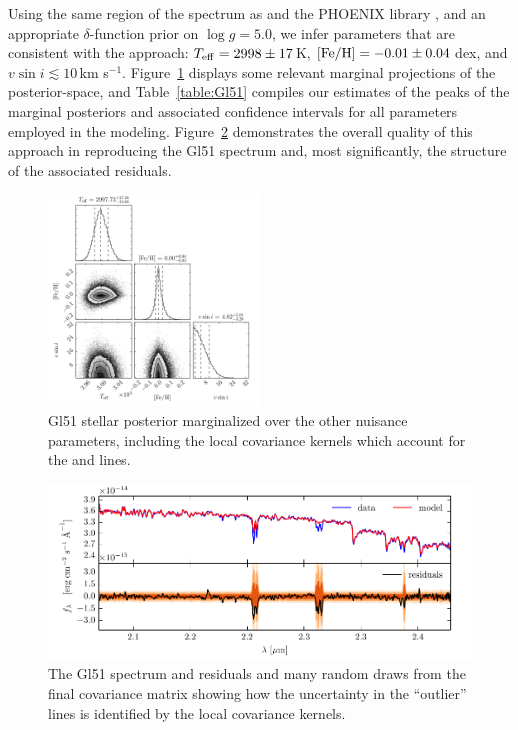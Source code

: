 \documentclass[iop,floatfix]{emulateapj}
\begin{document}
Using the same region of the spectrum as \citet{rojas-ayala12} and the {\sc PHOENIX} library \citep{husser13}, and an appropriate $\delta$-function prior on $\log
g = 5.0$, we infer parameters that are consistent with the \citet{rojas-ayala}
approach: $T_{\rm eff} = 2998 \pm17$\,K, $[{\rm Fe/H}] = -0.01\pm0.04$\,dex, and
$v \sin i \lesssim 10$\,km s$^{-1}$.  Figure~\ref{fig:Gl51_posterior}
displays some relevant marginal projections of the posterior-space, and
Table~\ref{table:Gl51} compiles our estimates of the peaks of the marginal
posteriors and associated confidence intervals for all parameters employed in
the modeling.  Figure~\ref{fig:Gl51_residuals} demonstrates the overall
quality of this approach in reproducing the Gl51 spectrum and, most
significantly, the structure of the associated residuals.

\begin{figure}[!htb]
\begin{center}
  \includegraphics[width=0.5\textwidth]{figs/Gl51_triangle.pdf}
  \caption{Gl51 stellar posterior marginalized over the other nuisance parameters, including the local covariance kernels which account for the  and  lines.}
\label{fig:Gl51_posterior}
\end{center}
\end{figure}

\begin{figure}[!htb]
\begin{center}
  \includegraphics{figs/residuals_Gl51_logg.pdf}
  \caption{The Gl51 spectrum and residuals and many random draws from the final covariance matrix showing how the uncertainty in the ``outlier'' lines is identified by the local covariance kernels.}
\label{fig:Gl51_residuals}
\end{center}
\end{figure}
\end{document}
